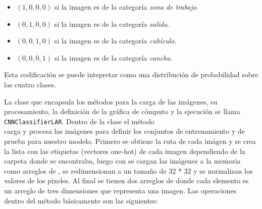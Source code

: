 \begin{itemize}
\item $(1, 0, 0, 0)$ si la imagen es de la categoría \textit{zona de trabajo}.
\item $(0, 1, 0, 0)$ si la imagen es de la categoría \textit{salida}.
\item $(0, 0, 1, 0)$ si la imagen es de la categoría \textit{cubículo}.
\item $(0, 0, 0, 1)$ si la imagen es de la categoría \textit{cancha}.
\end{itemize}

Esta codificación se puede intepretar como una distribución de probabilidad
sobre las cuatro clases.

La clase que encapsula los métodos para la carga de las imágenes, su 
procesamiento, la definición de la gráfica de cómputo y la ejecución se
llama \texttt{CNNClassifierLAR}.
Dentro de la clase el método\\ {\hyperref[\detokenize{model_desc:cnn_indoor_classifier_model.CNNClassifierLAR.get_training_and_test_images}]{}}
carga y procesa las imágenes para definir los conjuntos de entrenamiento
y de prueba para nuestro modelo.
Primero se obtiene la ruta de cada imágen y se crea la lista con las etiquetas
(vectores one-hot)
de cada imagen dependiendo de la carpeta donde se encontraba, luego con
 se cargan las imágenes a la memoria como arreglos de
, se redimensionan a un tamaño de 32 * 32 y se normalizan
los valores de los pixeles. Al final se tienen dos arreglos de 
donde cada elemento es un arreglo de tres dimensiones que
representa una imagen. Las operaciones dentro del método
básicamente son las siguientes:

